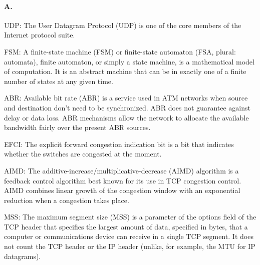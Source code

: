 \paragraph{A.}
UDP:
The User Datagram Protocol (UDP) is one of the core members of the Internet protocol suite.

\subitem FSM:
A finite-state machine (FSM) or finite-state automaton (FSA, plural: automata), finite automaton, or simply a state machine, is a mathematical model of computation. It is an abstract machine that can be in exactly one of a finite number of states at any given time. 

\subitem ABR:
Available bit rate (ABR) is a service used in ATM networks when source and destination don't need to be synchronized. ABR does not guarantee against delay or data loss. ABR mechanisms allow the network to allocate the available bandwidth fairly over the present ABR sources. 

\subitem EFCI:
The explicit forward congestion indication bit is a bit that indicates whether the switches are congested at the moment.

\subitem AIMD:
The additive-increase/multiplicative-decrease (AIMD) algorithm is a feedback control algorithm best known for its use in TCP congestion control. AIMD combines linear growth of the congestion window with an exponential reduction when a congestion takes place. 

\subitem MSS:
The maximum segment size (MSS) is a parameter of the options field of the TCP header that specifies the largest amount of data, specified in bytes, that a computer or communications device can receive in a single TCP segment. It does not count the TCP header or the IP header (unlike, for example, the MTU for IP datagrams).